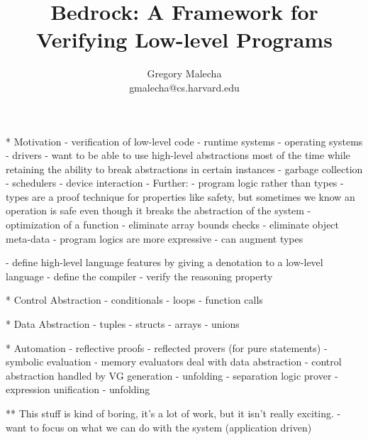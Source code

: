 \documentclass{beamer}
\title[Bedrock]{Bedrock: A Framework for Verifying Low-level Programs}
\author[Gregory Malecha]{Gregory Malecha\\gmalecha@cs.harvard.edu}
\institute{Harvard University SEAS}
\begin{document}
\begin{frame}
\maketitle
\end{frame}

* Motivation
  - verification of low-level code
    - runtime systems
    - operating systems
    - drivers
  - want to be able to use high-level abstractions most of the time
    while retaining the ability to break abstractions in certain instances
    - garbage collection
    - schedulers
    - device interaction
  - Further:
    - program logic rather than types
      - types are a proof technique for properties like safety, but sometimes
        we know an operation is safe even though it breaks the abstraction of
        the system
        - optimization of a function
        - eliminate array bounds checks
        - eliminate object meta-data
    - program logics are more expressive
    - can augment types

  - define high-level language features by giving a denotation to
    a low-level language
    - define the compiler
    - verify the reasoning property

* Control Abstraction
  - conditionals
  - loops
  - function calls

* Data Abstraction
  - tuples
  - structs
  - arrays
  - unions

* Automation
  - reflective proofs
  - reflected provers (for pure statements)
  - symbolic evaluation
    - memory evaluators deal with data abstraction
    - control abstraction handled by VG generation
    - unfolding
  - separation logic prover
    - expression unification
    - unfolding

** This stuff is kind of boring, it's a lot of work, but it isn't really 
   exciting.
   - want to focus on what we can do with the system (application driven)




\end{document}
